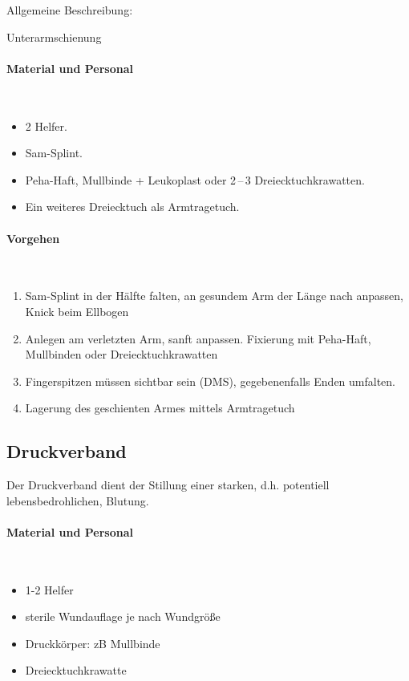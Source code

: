 Allgemeine
Beschreibung: 

Unterarmschienung

\paragraph*{Material und Personal}~

\begin{itemize}
    \item 2 Helfer.
    \item Sam-Splint.
    \item Peha-Haft, Mullbinde + Leukoplast oder 2\,--\,3 Dreiecktuchkrawatten.
    \item Ein weiteres Dreiecktuch als Armtragetuch.
\end{itemize}


\paragraph*{Vorgehen}~

\begin{enumerate}
    \item Sam-Splint in der Hälfte falten, an gesundem Arm der Länge
    nach anpassen, Knick beim Ellbogen
    \item Anlegen am verletzten Arm, sanft anpassen. Fixierung mit
    Peha-Haft, Mullbinden oder Dreiecktuchkrawatten
    \item Fingerspitzen müssen sichtbar sein (DMS), gegebenenfalls Enden
    umfalten.
    \item Lagerung des geschienten Armes mittels Armtragetuch
\end{enumerate}



\subsection{Druckverband}
\label{topic:druckverband-anlegen}

Der Druckverband dient der Stillung einer starken, d.h.
potentiell lebensbedrohlichen, Blutung.

\paragraph*{Material und Personal}~

\begin{itemize}
    \item 1-2 Helfer
    \item sterile Wundauflage je nach Wundgröße
    \item Druckkörper: zB Mullbinde
    \item Dreiecktuchkrawatte
\end{itemize}

